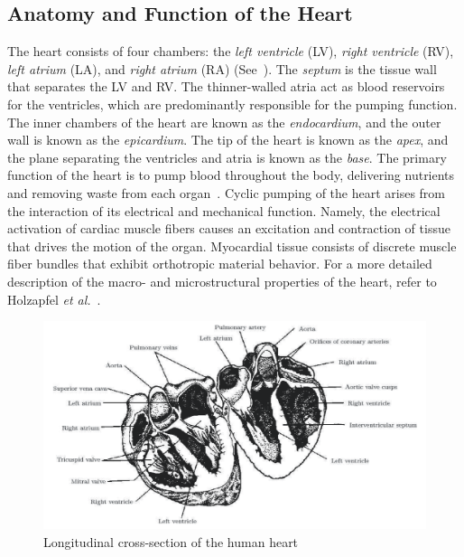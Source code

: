 \subsection{Anatomy and Function of the Heart}
The heart consists of four chambers: the \textit{left ventricle} (LV), \textit{right ventricle} (RV), \textit{left atrium} (LA), and \textit{right atrium} (RA) (See~). The \textit{septum} is the tissue wall that separates the LV and RV. The thinner-walled atria act as blood reservoirs for the ventricles, which are predominantly responsible for the pumping function. The inner chambers of the heart are known as the \textit{endocardium}, and the outer wall is known as the \textit{epicardium}. The tip of the heart is known as the \textit{apex}, and the plane separating the ventricles and atria is known as the \textit{base}. The primary function of the heart is to pump blood throughout the body, delivering nutrients and removing waste from each organ~\cite{holzapfel_2009}. Cyclic pumping of the heart arises from the interaction of its electrical and mechanical function. Namely, the electrical activation of cardiac muscle fibers causes an excitation and contraction of tissue that drives the motion of the organ. Myocardial tissue consists of discrete muscle fiber bundles that exhibit orthotropic material behavior. For a more detailed description of the macro- and microstructural properties of the heart, refer to Holzapfel \textit{et al.}~\cite{holzapfel_2009}.

\begin{figure}[htbp!]
\centering
\includegraphics[width=1.0\textwidth]{media/anatomy.png}
\caption{Longitudinal cross-section of the human heart~\cite{katz_2015}}
\label{fig:anatomy}
\end{figure}

